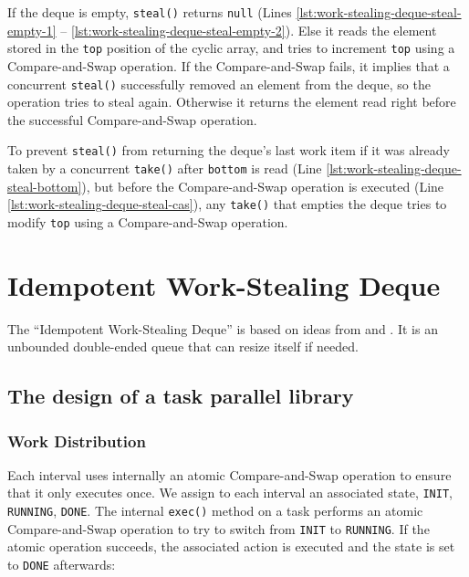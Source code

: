 If the deque is empty, \lstinline!steal()! returns \lstinline!null!
(Lines \ref{lst:work-stealing-deque-steal-empty-1} --
\ref{lst:work-stealing-deque-steal-empty-2}). Else it reads the
element stored in the \lstinline!top! position of the cyclic array,
and tries to increment \lstinline!top! using a Compare-and-Swap
operation. If the Compare-and-Swap fails, it implies that a concurrent
\lstinline!steal()! successfully removed an element from the deque, so
the operation tries to steal again. Otherwise it returns the element
read right before the successful Compare-and-Swap operation.

To prevent \lstinline!steal()! from returning the deque's last work
item if it was already taken by a concurrent \lstinline!take()! after
\lstinline!bottom! is read (Line
\ref{lst:work-stealing-deque-steal-bottom}), but before the
Compare-and-Swap operation is executed (Line
\ref{lst:work-stealing-deque-steal-cas}), any \lstinline!take()! that
empties the deque tries to modify \lstinline!top! using a
Compare-and-Swap operation.



\section{Idempotent Work-Stealing Deque}
\label{sec:queues-implementation-idempotent-ws-deque}

The ``Idempotent Work-Stealing Deque'' is based on ideas from
\cite{Leijen2009} and \cite{Michael2009}. It is an unbounded
double-ended queue that can resize itself if needed.

\subsection{The design of a task parallel library \cite{Leijen2009}}

\subsubsection{Work Distribution}

Each interval uses internally an atomic Compare-and-Swap operation to
ensure that it only executes once. We assign to each interval an
associated state, \lstinline!INIT!, \lstinline!RUNNING!,
\lstinline!DONE!. The internal \lstinline!exec()! method on a task
performs an atomic Compare-and-Swap operation to try to switch from
\lstinline!INIT! to \lstinline!RUNNING!. If the atomic operation
succeeds, the associated action is executed and the state is set to
\lstinline!DONE! afterwards:

